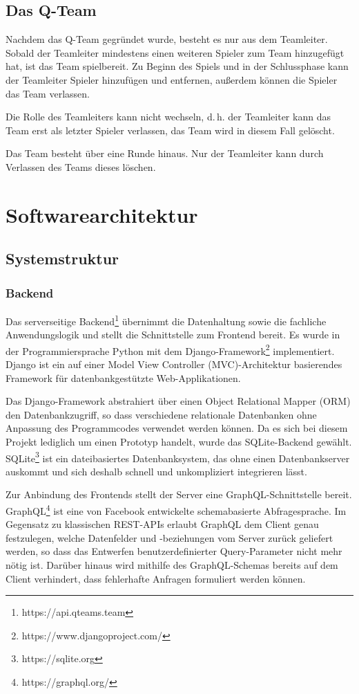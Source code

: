 \documentclass[a4paper,11pt,listof=numbered,glossary=totoc,parskip=half,toc=bib]{scrreprt}
\newcommand{\dash}{\mbox{d.\,h.}\xspace}
\begin{document}
	\section{Das Q-Team}
	Nachdem das Q-Team gegründet wurde, besteht es nur aus dem Teamleiter. Sobald der Teamleiter mindestens einen weiteren Spieler zum Team hinzugefügt hat, ist das Team spielbereit. Zu Beginn des Spiels und in der Schlussphase kann der Teamleiter Spieler hinzufügen und entfernen, außerdem können die Spieler das Team verlassen.
	
	Die Rolle des Teamleiters kann nicht wechseln, \dash der Teamleiter kann das Team erst als letzter Spieler verlassen, das Team wird in diesem Fall gelöscht.
	
	Das Team besteht über eine Runde hinaus. Nur der Teamleiter kann durch Verlassen des Teams dieses löschen.
	
	\chapter{Softwarearchitektur}
	\section{Systemstruktur}
		\subsection{Backend}
	\label{subsec:backend}
	Das serverseitige Backend\footnote{https://api.qteams.team} übernimmt die Datenhaltung sowie die fachliche Anwendungslogik und stellt die Schnittstelle zum Frontend bereit. Es wurde in der Programmiersprache Python mit dem Django-Framework\footnote{https://www.djangoproject.com/} implementiert. Django ist ein auf einer \frqq{}Model View Controller (MVC)\flqq{}-Architektur basierendes Framework für datenbankgestützte Web-Applikationen.
	
	Das Django-Framework abstrahiert über einen Object Relational Mapper (ORM) den Datenbankzugriff, so dass verschiedene relationale Datenbanken ohne Anpassung des Programmcodes verwendet werden können. Da es sich bei diesem Projekt lediglich um einen Prototyp handelt, wurde das SQLite-Backend gewählt. SQLite\footnote{https://sqlite.org} ist ein dateibasiertes Datenbanksystem, das ohne einen Datenbankserver auskommt und sich deshalb schnell und unkompliziert integrieren lässt.
	
	Zur Anbindung des Frontends stellt der Server eine GraphQL-Schnittstelle bereit. GraphQL\footnote{https://graphql.org/} ist eine von Facebook entwickelte schemabasierte Abfragesprache. Im Gegensatz zu klassischen REST-APIs erlaubt GraphQL dem Client genau festzulegen, welche Datenfelder und -beziehungen vom Server zurück geliefert werden, so dass das Entwerfen benutzerdefinierter Query-Parameter nicht mehr nötig ist. Darüber hinaus wird mithilfe des GraphQL-Schemas bereits auf dem Client verhindert, dass fehlerhafte Anfragen formuliert werden können.
	
\end{document}
